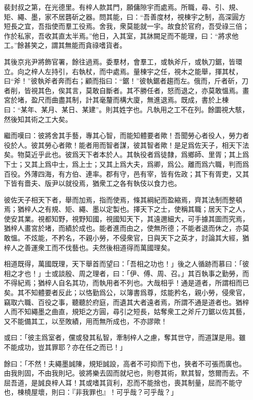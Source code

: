 \documentclass[12pt,a4paper]{ctexbook}
\begin{document}
裴封叔之第，在光德里。有梓人款其門，願傭隙宇而處焉。所職，尋、引、規、矩、繩、墨，家不居礱斫之器。問其能，曰：“吾善度材，視棟宇之制，高深圓方短長之宜，吾指使而羣工役焉。舍我，衆莫能就一宇。故食於官府，吾受祿三倍；作於私家，吾收其直太半焉。”他日，入其室，其牀闕足而不能理，曰：“將求他工。”餘甚笑之，謂其無能而貪祿嗜貨者。\par
其後京兆尹將飾官署，餘往過焉。委羣材，會羣工，或執斧斤，或執刀鋸，皆環立。向之梓人左持引，右執杖，而中處焉。量棟宇之任，視木之能舉，揮其杖，曰“斧！”彼執斧者奔而右；顧而指曰：“鋸！”彼執鋸者趨而左。俄而，斤者斫，刀者削，皆視其色，俟其言，莫敢自斷者。其不勝任者，怒而退之，亦莫敢慍焉。畫宮於堵，盈尺而曲盡其制，計其毫釐而構大廈，無進退焉。既成，書於上棟曰：“某年、某月、某日、某建”。則其姓字也。凡執用之工不在列。餘圜視大駭，然後知其術之工大矣。\par
繼而嘆曰：彼將舍其手藝，專其心智，而能知體要者歟！吾聞勞心者役人，勞力者役於人。彼其勞心者歟！能者用而智者謀，彼其智者歟！是足爲佐天子，相天下法矣。物莫近乎此也。彼爲天下者本於人。其執役者爲徒隸，爲鄉師、里胥；其上爲下士；又其上爲中士，爲上士；又其上爲大夫，爲卿，爲公。離而爲六職，判而爲百役。外薄四海，有方伯、連率。郡有守，邑有宰，皆有佐政；其下有胥吏，又其下皆有嗇夫、版尹以就役焉，猶衆工之各有執伎以食力也。\par
彼佐天子相天下者，舉而加焉，指而使焉，條其綱紀而盈縮焉，齊其法制而整頓焉；猶梓人之有規、矩、繩、墨以定製也。擇天下之士，使稱其職；居天下之人，使安其業。視都知野，視野知國，視國知天下，其遠邇細大，可手據其圖而究焉，猶梓人畫宮於堵，而績於成也。能者進而由之，使無所德；不能者退而休之，亦莫敢慍。不炫能，不矜名，不親小勞，不侵衆官，日與天下之英才，討論其大經，猶梓人之善運衆工而不伐藝也。夫然後相道得而萬國理矣。\par
相道既得，萬國既理，天下舉首而望曰：「吾相之功也！」後之人循跡而慕曰：「彼相之才也！」士或談殷、周之理者，曰：「伊、傅、周、召。」其百執事之勤勞，而不得紀焉；猶梓人自名其功，而執用者不列也。大哉相乎！通是道者，所謂相而已矣。其不知體要者反此；以恪勤爲公，以簿書爲尊，炫能矜名，親小勞，侵衆官，竊取六職、百役之事，聽聽於府庭，而遺其大者遠者焉，所謂不通是道者也。猶梓人而不知繩墨之曲直，規矩之方圓，尋引之短長，姑奪衆工之斧斤刀鋸以佐其藝，又不能備其工，以至敗績，用而無所成也，不亦謬歟！\par
或曰：「彼主爲室者，儻或發其私智，牽制梓人之慮，奪其世守，而道謀是用。雖不能成功，豈其罪耶？亦在任之而已！」\par
餘曰：「不然！夫繩墨誠陳，規矩誠設，高者不可抑而下也，狹者不可張而廣也。由我則固，不由我則圮。彼將樂去固而就圮也，則卷其術，默其智，悠爾而去。不屈吾道，是誠良梓人耳！其或嗜其貨利，忍而不能捨也，喪其制量，屈而不能守也，棟橈屋壞，則曰：『非我罪也』！可乎哉？可乎哉？」\par
\end{document}
